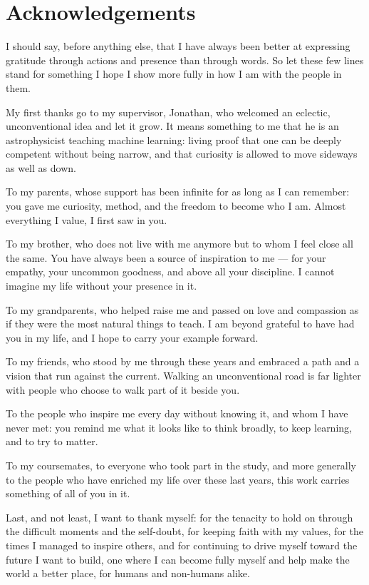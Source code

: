 \chapter*{Acknowledgements}

I should say, before anything else, that I have always been better at expressing gratitude through actions and presence than through words. So let these few lines stand for something I hope I show more fully in how I am with the people in them.

My first thanks go to my supervisor, Jonathan, who welcomed an eclectic, unconventional idea and let it grow. It means something to me that he is an astrophysicist teaching machine learning: living proof that one can be deeply competent without being narrow, and that curiosity is allowed to move sideways as well as down.

To my parents, whose support has been infinite for as long as I can remember: you gave me curiosity, method, and the freedom to become who I am. Almost everything I value, I first saw in you.

To my brother, who does not live with me anymore but to whom I feel close all the same. You have always been a source of inspiration to me --- for your empathy, your uncommon goodness, and above all your discipline. I cannot imagine my life without your presence in it.

To my grandparents, who helped raise me and passed on love and compassion as if they were the most natural things to teach. I am beyond grateful to have had you in my life, and I hope to carry your example forward.

To my friends, who stood by me through these years and embraced a path and a vision that run against the current. Walking an unconventional road is far lighter with people who choose to walk part of it beside you.

To the people who inspire me every day without knowing it, and whom I have never met: you remind me what it looks like to think broadly, to keep learning, and to try to matter.

To my coursemates, to everyone who took part in the study, and more generally to the people who have enriched my life over these last years, this work carries something of all of you in it.

Last, and not least, I want to thank myself: for the tenacity to hold on through the difficult moments and the self-doubt, for keeping faith with my values, for the times I managed to inspire others, and for continuing to drive myself toward the future I want to build, one where I can become fully myself and help make the world a better place, for humans and non-humans alike.

\cleardoublepage

